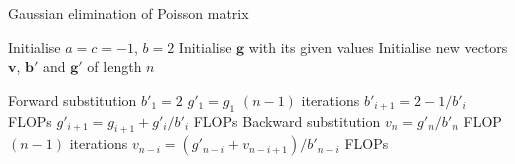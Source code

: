 \documentclass[english,notitlepage,aps,pra,10pt]{revtex4-2}
\newcommand{\bv}[1]{\mathbf{#1}}
\begin{document}
\begin{algorithm}[H]
    \caption{Gaussian elimination of Poisson matrix}\label{algo:PoissonGauss}
    \begin{algorithmic}
        \State Initialise $a = c = -1$, $b = 2$
        \State Initialise $\bv{g}$ with its given values
        \State Initialise new vectors $\bv{v}$, $\bv{b}'$ and $\bv{g}'$ of length $n$ 

        \Comment Forward substitution
        \State $b'_1 = 2$
        \State $g'_1 = g_1$
                                \Comment $(n-1)$ iterations
            \State $b'_{i+1} = 2 - 1/b'_i$                   FLOPs 
            \State $g'_{i+1} = g_{i+1} + g'_{i}/b'_{i}$      FLOPs 
        \EndFor
        \Comment Backward substitution
        \State $v_n = g'_n/b'_n$                             FLOP 
                                \Comment $(n-1)$ iterations
            \State $v_{n-i} = (g'_{n-i} + v_{n-i+1})/b'_{n-i}$   FLOPs
        \EndFor
    \end{algorithmic}
\end{algorithm}

\end{document}

